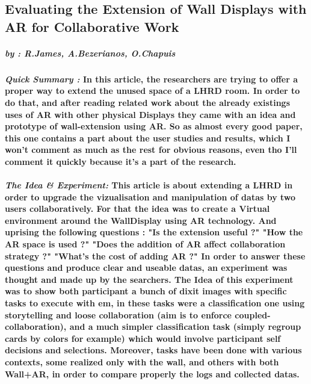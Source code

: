 \subsection*{Evaluating the Extension of Wall Displays with AR for Collaborative Work}
    \subparagraph{by : R.James, A.Bezerianos, O.Chapuis}
    \cite{james2023evaluating}
    \paragraph{ \textit{Quick Summary :} 
                \newline
                \indent \indent \textnormal{In this article, the researchers are trying to offer a proper way to extend the unused space
                of a LHRD room. In order to do that, and after reading related work about the already existings uses of AR with other physical Displays
                they came with an idea and prototype of wall-extension using AR. }
                \indent \indent \textnormal{So as almost every good paper, this one contains a part about the user studies and results, which I won't 
                comment as much as the rest for obvious reasons, even tho I'll comment it quickly because it's a part of the research.} }
    
    \paragraph{ \textit{The Idea \& Experiment:} 
                \newline
                \indent \indent \textnormal{This article is about extending a LHRD in order to upgrade the vizualisation and manipulation of datas by two
                users collaboratively. For that the idea was to create a Virtual environment around the WallDisplay using AR technology. And uprising the following questions :
                \newline \indent "Is the extension useful ?" 
                \newline \indent "How the AR space is used ?"
                \newline \indent "Does the addition of AR affect collaboration strategy ?"
                \newline \indent "What's the cost of adding AR ?"}
                \indent \indent \textnormal{In order to answer these questions and produce clear and useable datas, an experiment was thought and made up by the searchers. 
                The Idea of this experiment was to show both participant a bunch of dixit images with specific tasks to execute with em, in these tasks were a classification 
                one using storytelling and loose collaboration (aim is to enforce coupled-collaboration), and a much simpler classification task (simply regroup cards by colors 
                for example) which would involve participant self decisions and selections. Moreover, tasks have been done with various contexts, some realized only with the wall,
                and others with both Wall+AR, in order to compare properly the logs and collected datas.}}

